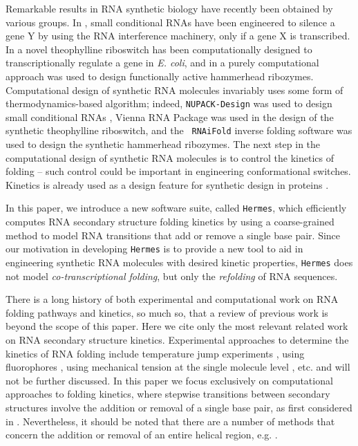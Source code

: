 Remarkable results in RNA synthetic biology have recently been
obtained by various groups. In \cite{Hochrein.jacs13}, small
conditional RNAs have been engineered to silence a gene Y by using the
RNA interference machinery, only if a gene X is transcribed. In
\cite{Wachsmuth.nar13} a novel theophylline riboswitch has been
computationally designed to transcriptionally regulate a gene in {\em
E. coli}, and in \cite{syntheticHammerheads} a purely computational
approach was used to design functionally active hammerhead ribozymes.
Computational design of synthetic RNA molecules invariably uses some
form of thermodynamics-based algorithm; indeed, {\tt NUPACK-Design}
\cite{Zadeh.jcc11} was used to design small conditional RNAs
\cite{Hochrein.jacs13}, Vienna RNA Package \cite{Gruber08} was used in
the design of the synthetic theophylline riboswitch, and the {\tt
RNAiFold} inverse folding software
\cite{garcia.JBCBB13,GarciaMartin.nar13} was used to design the
synthetic hammerhead ribozymes. The next step in the computational
design of synthetic RNA molecules is to control the kinetics of
folding -- such control could be important in engineering
conformational switches. Kinetics is already used as a design feature
for synthetic design in proteins \cite{Bujotzek.jcam11,Fasting.acie12}.

In this paper, we introduce a new software suite, called {\tt Hermes},
which efficiently computes RNA secondary structure
folding kinetics by using a coarse-grained
method to model RNA transitions that add or remove a single base pair.
Since our motivation in developing {\tt Hermes} is to provide a new
tool to aid in engineering synthetic RNA molecules with desired
kinetic properties, {\tt Hermes} does not model {\em co-transcriptional
folding}, but only the {\em refolding} of RNA sequences.

There is a long history of both experimental and computational work on
RNA folding pathways and kinetics, so much so, that a review of
previous work is beyond the scope of this paper. Here we cite only the
most relevant related work on RNA secondary structure
kinetics. Experimental approaches to
determine the kinetics of RNA folding include temperature jump
experiments \cite{lecuyerCrothers}, using fluorophores
\cite{Hobartner.jmb03}, using mechanical tension at the single
molecule level \cite{Vieregg.mp06}, etc. and will not be further
discussed. In this paper we focus exclusively on computational
approaches to folding kinetics, where stepwise transitions between
secondary structures involve the addition or removal of a single base
pair, as first considered in \cite{flammHofacker}.
Nevertheless, it should be noted that there are a number of
methods that concern the addition or removal of an entire helical
region, e.g. \cite{Huang.bb14,Zhao.jcp11}.

